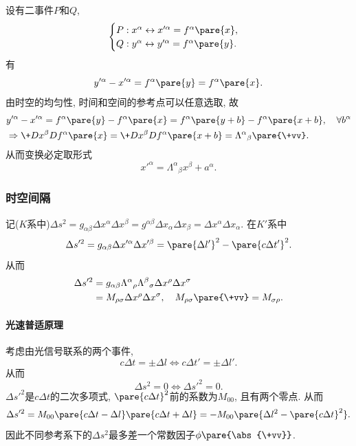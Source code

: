 \documentclass[hidelinks]{ctexart}
\begin{document}
设有二事件$P$和$Q$,
\[ \begin{cases}
    P: x^\alpha \leftrightarrow x'^\alpha = f^\alpha\pare{x}, \\
    Q: y^\alpha \leftrightarrow y'^\alpha = f^\alpha\pare{y}.
\end{cases} \]
有
\[ y'^\alpha - x'^\alpha = f^\alpha\pare{y} = f^\alpha\pare{x}. \]
由时空的均匀性, 时间和空间的参考点可以任意选取, 故
\begin{align*}
    & y'^\alpha - x'^\alpha = f^\alpha\pare{y} - f^\alpha\pare{x} = f^\alpha\pare{y+b} - f^\alpha\pare{x+b},\quad \forall b^\alpha\\
    & \Rightarrow \+D{x^\beta}D{f^\alpha}\pare{x} = \+D{x^\beta}D{f^\alpha}\pare{x+b} = {\Lambda^\alpha}_\beta\pare{\+vv}.
\end{align*}
从而变换必定取形式
\[ x'^\alpha = {\Lambda^\alpha}_\beta x^\beta + a^\alpha. \]


\subsubsection{时空间隔} %
\label{ssub:时空间隔}

记($K$系中)$\Delta s^2 = g_{\alpha\beta} \Delta x^\alpha \Delta x^\beta = g^{\alpha\beta}\Delta x_\alpha \Delta x_\beta = \Delta x^\alpha \Delta x_\alpha$. 在$K'$系中
\[ \Delta s'^2 = g_{\alpha\beta} \Delta x'^\alpha \Delta x'^\beta = \pare{\Delta l'}^2 - \pare{c\Delta t'}^2. \]
从而
\begin{align*}
    \Delta s'^2 &= g_{\alpha\beta}{\Lambda^\alpha}_\rho {\Lambda^\beta}_\sigma \Delta x^\rho \Delta x^\sigma \\
    &= M_{\rho\sigma}\Delta x^\rho \Delta x^\sigma,\quad M_{\rho\sigma}\pare{\+vv} = M_{\sigma\rho}.
\end{align*}

\paragraph{光速普适原理} %
\label{par:光速普适原理}

考虑由光信号联系的两个事件,
\[ c\Delta t = \pm \Delta l \Leftrightarrow c\Delta t' = \pm \Delta l'. \]
从而
\[ \Delta s^2 = 0 \Leftrightarrow \Delta s'^2 = 0. \]
$\Delta s'^2$是$c\Delta t$的二次多项式, $\pare{c\Delta t}^2$前的系数为$M_{00}$, 且有两个零点. 从而
\[ \Delta s'^2 = M_{00}\pare{c\Delta t - \Delta l}\pare{c\Delta t + \Delta l} = -M_{00}\pare{\Delta l^2-\pare{c\Delta t}^2}. \]
因此不同参考系下的$\Delta s^2$最多差一个常数因子$\phi\pare{\abs{\+vv}}$.
\end{document}
